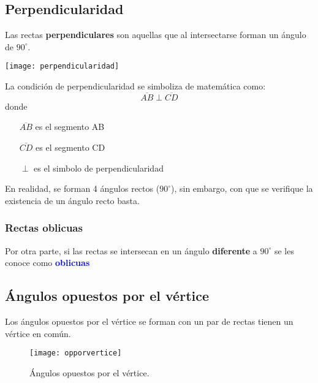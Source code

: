\subsection{Perpendicularidad}


\begin{definition}
  Las rectas \textbf{perpendiculares} son aquellas que al intersectarse forman 
  un ángulo de $90^\circ$.
  \begin{center}
    \texttt{[image: perpendicularidad]}
  \end{center}
  La condición de perpendicularidad se simboliza de matemática como:
  \[\overline{AB} \perp \overline{CD}\]
  donde 
  \begin{itemize}
    \item [$\overline{AB}$] es el segmento AB
    \item [$\overline{CD}$] es el segmento CD
    \item [$\perp$] es el simbolo de perpendicularidad
  \end{itemize}

  En realidad, se forman 4 ángulos rectos ($90^\circ$), sin embargo, con que se 
  verifique la existencia de un ángulo recto basta.

\end{definition}

\subsubsection{Rectas oblicuas}

Por otra parte, si las rectas se intersecan en un ángulo \textbf{diferente} a 
$90^\circ$ se les conoce como \textbf{\textcolor{blue}{oblicuas}}

\subsection{Ángulos opuestos por el vértice}

Los ángulos opuestos por el vértice se forman con un par de rectas 
 tienen un vértice en común.

\begin{figure}[ht!]
	\texttt{[image: opporvertice]}
	\caption[AngOpVertice]{Ángulos opuestos por el vértice.}
\end{figure}

